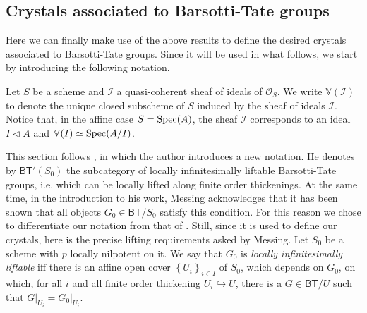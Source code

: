 \subsection{Crystals associated to Barsotti-Tate groups}
Here we can finally make use of the above results to define the desired crystals
associated to Barsotti-Tate groups.
Since it will be used in what follows,
we start by introducing the following notation.


\begin{ntt}
	Let $S$ be a scheme and $\mathcal{I}$ a quasi-coherent sheaf of
	ideals of $\mathcal{O}_{ S }$.
	We write $\mathbb{V}(\mathcal{I})$ to denote the unique
	closed subscheme of $S$ induced by the sheaf of ideals $\mathcal{I}$.
	Notice that, in the affine case $S = \operatorname{Spec}(A)$,
	the sheaf $\mathcal{I}$ corresponds to an ideal $I \triangleleft A$
	and $\mathbb{V}(I) \simeq \operatorname{Spec}(A/I)$.
\end{ntt} 


\begin{rem}[]\label{rem:LocallyLiftableBTG}
	This section follows \cite[Chpater IV, \S2]{Messing},
	in which the author introduces a new notation.
	He denotes by $\mathsf{BT}'(S_0)$ the subcategory of
	locally infinitesimally liftable Barsotti-Tate groups, i.e$.$ 
	which can be locally lifted along finite order thickenings.
	At the same time, in the introduction to his work, Messing acknowledges that
	it has been shown that all objects $G_0 \in \mathsf{BT}/S_0$ satisfy
	this condition.
	For this reason we chose to differentiate our notation from that of \cite{Messing}.
	Still, since it is used to define our crystals, here is the precise lifting
	requirements asked by Messing.
	Let $S_0$ be a scheme with $p$ locally nilpotent on it.
	We say that $G_0$ is \emph{locally infinitesimally liftable} iff
	there is an affine open cover $\left\{ U_i \right\}_{i \in I}$ of $S_0$, which depends on $G_0$, 
	on which, for all $i$ and all finite order thickening $U_i \hookrightarrow U$,
	there is a $G \in \mathsf{BT}/U$ such that
	$\left.G\right|_{U_i} = \left.G_0\right|_{U_i}$.
\end{rem}


